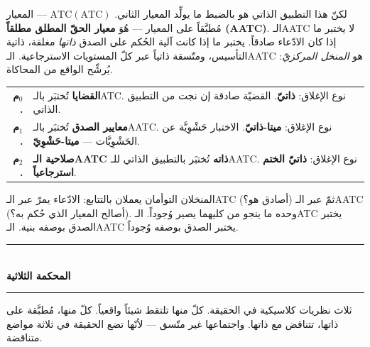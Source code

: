 \documentclass[10pt, openany, oneside]{book}
\renewcommand{\normalsize}{\fontsize{10}{13}\selectfont}
\renewcommand{\footnotesize}{\fontsize{8.5}{11}\selectfont}
\begin{document}
لكنّ هذا التطبيق الذاتي هو بالضبط ما يولِّد المعيار الثاني. $\text{ATC}(\text{ATC})$ --- المعيار مُطبَّقاً على المعيار --- هُوَ \textbf{معيار الحقّ المطلق مطلقاً (AATC)}. الـAATC لا يختبر ما إذا كان الادّعاء صادقاً. يختبر ما إذا كانت آلية الحُكم على الصدق \textit{ذاتها} مغلقة، ذاتية التأسيس، ومتّسقة ذاتياً عبر كلّ المستويات الاسترجاعية. الـAATC هو \textit{المنخل المركزيّ}: يُرشِّح الواقع من المحاكاة.

{\footnotesize
\noindent\begin{tabular}{r p{}}
\textbf{م$_0$.} & \textbf{القضايا} تُختبَر بالـATC. نوع الإغلاق: \textbf{ذاتيّ}. القضيّة صادقة إن نجت من التطبيق الذاتي. \\[0.3em]
\textbf{م$_1$.} & \textbf{معايير الصدق} تُختبَر بالـAATC. نوع الإغلاق: \textbf{ميتا-ذاتيّ}. الاختبار حَشْوِيَّة عن الحَشْوِيَّات --- \textbf{ميتا-حَشْوِيّ}. \\[0.3em]
\textbf{م$_2$.} & \textbf{صلاحية الـAATC ذاته} تُختبَر بالتطبيق الذاتي للـAATC. نوع الإغلاق: \textbf{ذاتيّ الختم استرجاعياً}. \\[0.3em]
\end{tabular}
}

\vspace{0.8em}

\noindent المنخلان التوأمان يعملان بالتتابع: الادّعاء يمرّ عبر الـATC (أصادق هو؟) ثمّ عبر الـAATC (أصالح المعيار الذي حُكم به؟). وحده ما ينجو من كليهما يصير وُجوداً. الـATC يختبر الصدق بوصفه بنية. الـAATC يختبر الصدق بوصفه وُجوداً.

\vspace{1.5em}


\begin{center}
    \rule{0.3\textwidth}{0.4pt}\\[0.5em]
    {\normalsize\bfseries المحكمة الثلاثية}\\[0.3em]
    \rule{0.3\textwidth}{0.4pt}
\end{center}

\vspace{1em}

\noindent ثلاث نظريات كلاسيكية في الحقيقة. كلّ منها تلتقط شيئاً واقعياً. كلّ منها، مُطبَّقة على ذاتها، تتناقض مع ذاتها. واجتماعها غير متّسق --- لأنّها تضع الحقيقة في ثلاثة مواضع متناقضة.

\vspace{0.5em}
\end{document}
